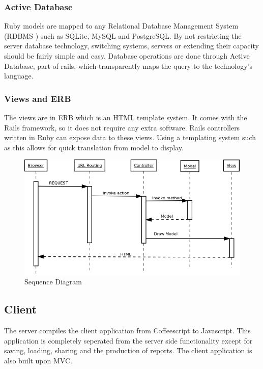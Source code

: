 \documentclass{report}
\begin{document}
				\subsubsection{Active Database}
					Ruby models are mapped to any Relational Database Management System (RDBMS \cite{rdbms} ) such as SQLite, MySQL and PostgreSQL. By not restricting the server database technology, switching systems, servers or extending their capacity should be fairly simple and easy. Database operations are done through Active Database, part of rails, which transparently maps the query to the technology's language.
					
				\subsubsection{Views and ERB} 
					The views are in ERB \cite{erb} which is an HTML template system. It comes with the Rails framework, so it does not require any extra software. Rails controllers written in Ruby can expose data to these views. Using a templating system such as this allows for quick translation from model to display. 
			\begin{figure}[htb]
				\begin{center}
				\includegraphics[width=\linewidth]{SequenceDiagramLife.png}
				\caption{Sequence Diagram}
				\label{fig: SequenceDiagram}
				\end{center}
				\end{figure}	
			\clearpage

			\subsection{Client}
				The server compiles the client application from Coffeescript to Javascript. This application is completely seperated from the server side functionality except for saving, loading, sharing and the production of reports. The client application is also built upon MVC.
				
\end{document}
